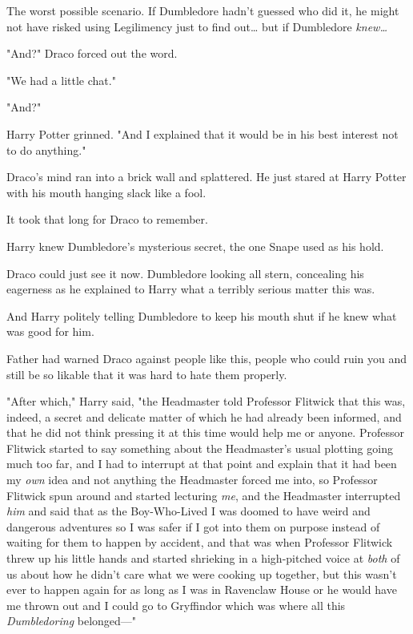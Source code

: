 The worst possible scenario. If Dumbledore hadn't guessed who did it, he might
not have risked using Legilimency just to find out{\ldots} but if Dumbledore
\emph{knew{\ldots}}

"And?" Draco forced out the word.

"We had a little chat."

"And?"

Harry Potter grinned. "And I explained that it would be in his best interest
not to do anything."

Draco's mind ran into a brick wall and splattered. He just stared at Harry
Potter with his mouth hanging slack like a fool.

It took that long for Draco to remember.

Harry knew Dumbledore's mysterious secret, the one Snape used as his hold.

Draco could just see it now. Dumbledore looking all stern, concealing his
eagerness as he explained to Harry what a terribly serious matter this was.

And Harry politely telling Dumbledore to keep his mouth shut if he knew what
was good for him.

Father had warned Draco against people like this, people who could ruin you and
still be so likable that it was hard to hate them properly.

"After which," Harry said, "the Headmaster told Professor Flitwick that this
was, indeed, a secret and delicate matter of which he had already been
informed, and that he did not think pressing it at this time would help me or
anyone. Professor Flitwick started to say something about the Headmaster's
usual plotting going much too far, and I had to interrupt at that point and
explain that it had been my \emph{own} idea and not anything the Headmaster
forced me into, so Professor Flitwick spun around and started lecturing
\emph{me}, and the Headmaster interrupted \emph{him} and said that as the
Boy-Who-Lived I was doomed to have weird and dangerous adventures so I was
safer if I got into them on purpose instead of waiting for them to happen by
accident, and that was when Professor Flitwick threw up his little hands and
started shrieking in a high-pitched voice at \emph{both} of us about how he
didn't care what we were cooking up together, but this wasn't ever to happen
again for as long as I was in Ravenclaw House or he would have me thrown out
and I could go to Gryffindor which was where all this \emph{Dumbledoring}
belonged---"

